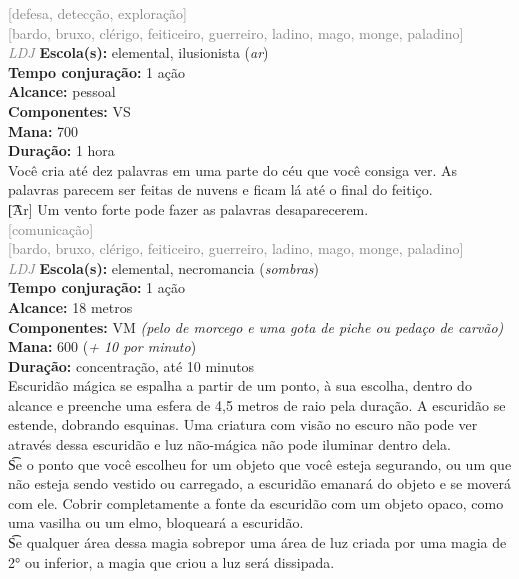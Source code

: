 \documentclass{RPG_Adventure}[2021/10/20]
\begin{document}
{\scriptsize \textcolor{gray}{[defesa, detecção, exploração]\\}}
{\scriptsize \textcolor{gray}{[bardo, bruxo, clérigo, feiticeiro, guerreiro, ladino, mago, monge, paladino]\\}}
{\tiny \textcolor{gray}{\textit{LDJ}}}
{\small \t \textbf{Escola(s):} elemental, ilusionista (\textit{ar})\\\t \textbf{Tempo conjuração:} 1 ação\\\t \textbf{Alcance:} pessoal\\\t \textbf{Componentes:} VS\\\t \textbf{Mana:} 700\\\t \textbf{Duração:} 1 hora\\}
{\normalsize Você cria até dez palavras em uma parte do céu que você consiga ver. As palavras parecem ser feitas de nuvens e ficam lá até o final do feitiço.\\\t [Ar] Um vento forte pode fazer as palavras desaparecerem.\\}
{\scriptsize \textcolor{gray}{[comunicação]\\}}
{\scriptsize \textcolor{gray}{[bardo, bruxo, clérigo, feiticeiro, guerreiro, ladino, mago, monge, paladino]\\}}
{\tiny \textcolor{gray}{\textit{LDJ}}}
{\small \t \textbf{Escola(s):} elemental, necromancia (\textit{sombras})\\\t \textbf{Tempo conjuração:} 1 ação\\\t \textbf{Alcance:} 18 metros\\\t \textbf{Componentes:} VM \textit{(pelo de morcego e uma gota de piche ou pedaço de carvão)}\\\t \textbf{Mana:} 600 (\textit{+ 10 por minuto})\\\t \textbf{Duração:} concentração, até 10 minutos\\}
{\normalsize Escuridão mágica se espalha a partir de um ponto, à sua escolha, dentro do alcance e preenche uma esfera de 4,5 metros de raio pela duração. A escuridão se estende, dobrando esquinas. Uma criatura com visão no escuro não pode ver através dessa escuridão e luz não-mágica não pode iluminar dentro dela.\\\t Se o ponto que você escolheu for um objeto que você esteja segurando, ou um que não esteja sendo vestido ou carregado, a escuridão emanará do objeto e se moverá com ele. Cobrir completamente a fonte da escuridão com um objeto opaco, como uma vasilha ou um elmo, bloqueará a escuridão.\\\t Se qualquer área dessa magia sobrepor uma área de luz criada por uma magia de 2° ou inferior, a magia que criou a luz será dissipada.\\}
\end{document}
